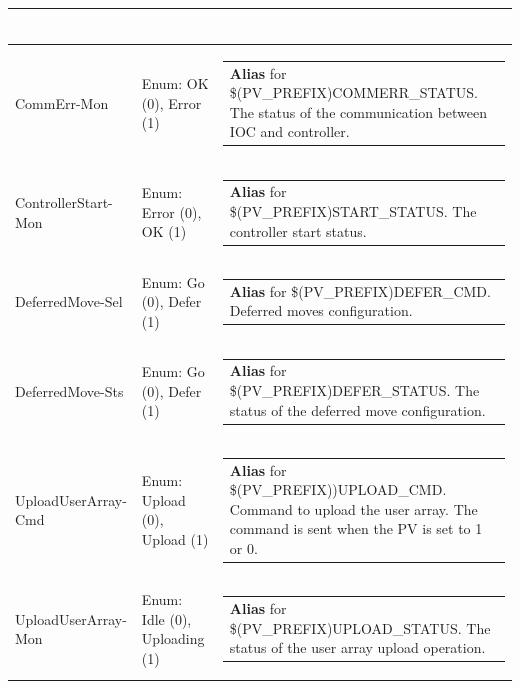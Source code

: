 \documentclass[openany]{article}
\begin{document}
\begin{longtable}{| m{4.5cm} m{2.5cm}  m{8.5cm} |}
\begin{tabular}{@{}m{6cm}@{}}
            \end{tabular} \hypertarget{pv:comm-err-mon}{}\\ \hline
        CommErr-Mon & Enum: OK (0), Error (1) & \begin{tabular}{@{}m{6cm}@{}}
                \textbf{\color{blue} Alias} for \$(PV\_PREFIX)COMMERR\_STATUS. The status of the communication between IOC and controller.
            \end{tabular} \hypertarget{pv:controller-start-mon}{}\\ \hline
        ControllerStart-Mon & Enum: Error (0), OK (1)  & \begin{tabular}{@{}m{6cm}@{}}
                \textbf{\color{blue} Alias} for \$(PV\_PREFIX)START\_STATUS. The controller start status.
            \end{tabular} \hypertarget{pv:deferred-move}{}\\ \hline
        DeferredMove-Sel & Enum: Go (0), Defer (1) & \begin{tabular}{@{}m{6cm}@{}}
                \textbf{\color{blue} Alias} for \$(PV\_PREFIX)DEFER\_CMD. Deferred moves configuration.
            \end{tabular} \hypertarget{}{}\\ \hline
        DeferredMove-Sts & Enum: Go (0), Defer (1) & \begin{tabular}{@{}m{6cm}@{}}
                \textbf{\color{blue} Alias} for \$(PV\_PREFIX)DEFER\_STATUS. The status of the deferred move configuration.
            \end{tabular} \hypertarget{pv:upload-user-array-cmd}{}\\ \hline
        UploadUserArray-Cmd & Enum: Upload (0), Upload (1) & \begin{tabular}{@{}m{6cm}@{}}
                \textbf{\color{blue} Alias} for \$(PV\_PREFIX))UPLOAD\_CMD. Command to upload the user array. The command is sent when the PV is set to 1 or 0.
            \end{tabular} \hypertarget{pv:upload-user-array-mon}{}\\ \hline
        UploadUserArray-Mon & Enum: Idle (0), Uploading (1) & \begin{tabular}{@{}m{6cm}@{}}
                \textbf{\color{blue} Alias} for \$(PV\_PREFIX)UPLOAD\_STATUS. The status of the user array upload operation.
            \end{tabular} \hypertarget{pv:deferred-move-mode}{}\\ \hline

\end{longtable}
\end{document}
